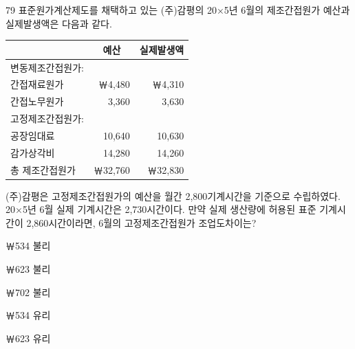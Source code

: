 \begin{question}{79}
표준원가계산제도를 채택하고 있는 (주)감평의 20×5년 6월의 제조간접원가 예산과 실제발생액은 다음과 같다.

{\small\centering\begin{tabular}{|l|r|r|}\hline
 & \multicolumn{1}{c|}{예산} & \multicolumn{1}{c|}{실제발생액} \\ \hline
변동제조간접원가: & & \\
\hspace{1.5em}간접재료원가 & ￦4,480 & ￦4,310 \\
\hspace{1.5em}간접노무원가 & 3,360 & 3,630 \\
고정제조간접원가: & & \\
\hspace{1.5em}공장임대료 & 10,640 & 10,630 \\
\hspace{1.5em}감가상각비 & 14,280 & 14,260 \\ \hline
총 제조간접원가 & ￦32,760 & ￦32,830 \\ \hline
\end{tabular}\par}
\medskip
(주)감평은 고정제조간접원가의 예산을 월간 2,800기계시간을 기준으로 수립하였다. 20×5년 6월 실제 기계시간은 2,730시간이다. 만약 실제 생산량에 허용된 표준 기계시간이 2,860시간이라면, 6월의 고정제조간접원가 조업도차이는?
\begin{choices}
  \item ￦534 불리
  \item ￦623 불리
  \item ￦702 불리
  \item ￦534 유리
  \item ￦623 유리
\end{choices}
\end{question}
